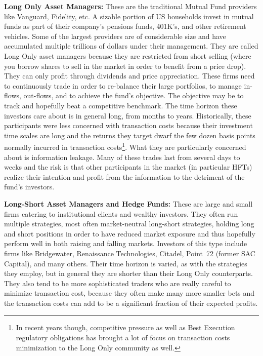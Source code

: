 \noindent\textbf{Long Only Asset Managers:} These are the traditional Mutual Fund providers like Vanguard, Fidelity, etc. A sizable portion of US households invest in mutual funds as part of their company's pensions funds, 401K's, and other retirement vehicles. Some of the largest providers are of considerable size and have accumulated multiple trillions of dollars under their management. They are called Long Only asset managers because they are restricted from short selling (where you borrow shares to sell in the market in order to benefit from a price drop). They can only profit through dividends and price appreciation. These firms need to continuously trade in order to re-balance their large portfolios, to manage in-flows, out-flows, and to achieve the fund's objective. The objective may be to track and hopefully beat a competitive benchmark. The time horizon these investors care about is in general long, from months to years. Historically, these participants were less concerned with transaction costs because their investment time scales are long and the returns they target dwarf the few dozen basis points normally incurred in transaction costs\footnote{In recent years though, competitive pressure as well as Best Execution regulatory obligations has brought a lot of focus on transaction costs minimization to the Long Only community as well.}. What they are particularly concerned about is information leakage. Many of these trades last from several days to weeks and the risk is that other participants in the market (in particular HFTs) realize their intention and profit from the information to the detriment of the fund's investors. \twomedskip


\noindent\textbf{Long-Short Asset Managers and Hedge Funds:} These are large and small firms catering to institutional clients and wealthy investors. They often run multiple strategies, most often market-neutral long-short strategies, holding long and short positions in order to have reduced market exposure and  thus hopefully perform well in both raising and falling markets. Investors of this type include firms like Bridgewater, Renaissance Technologies, Citadel, Point~72 (former SAC Capital), and many others. Their time horizon is varied, as with the strategies they employ, but in general they are shorter than their Long Only counterparts. They also tend to be more sophisticated traders who are really careful to minimize transaction cost, because they often make many more smaller bets and the transaction costs can add to be a significant fraction of their expected profits. \twomedskip



